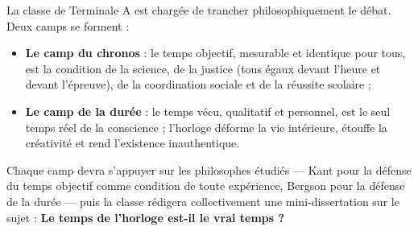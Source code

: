 \documentclass[11pt]{article}
\newcommand{\cle}[1]{{\popxbold\color{popdark}#1}}
\newcounter{popsec}
\newcounter{popsub}
\newcommand{\courssub}[1]{%
  \stepcounter{popsub}%
  \par\vspace{9pt}\noindent{\popxbold\fontsize{11.5}{13}\selectfont\color{popink}{\color{poporange}\thepopsec.\thepopsub}\hspace{6pt}#1}\par\nopagebreak\vspace{4pt}
}
\begin{document}
La classe de Terminale A est chargée de trancher philosophiquement le débat. Deux camps se forment :

\begin{itemize}
\item \textbf{Le camp du \cle{chronos}} : le temps objectif, mesurable et identique pour tous, est la condition de la science, de la justice (tous égaux devant l'heure et devant l'épreuve), de la coordination sociale et de la réussite scolaire ;
\item \textbf{Le camp de la \cle{durée}} : le temps vécu, qualitatif et personnel, est le seul temps réel de la conscience ; l'horloge déforme la vie intérieure, étouffe la créativité et rend l'existence inauthentique.
\end{itemize}

Chaque camp devra s'appuyer sur les philosophes étudiés — Kant pour la défense du temps objectif comme condition de toute expérience, Bergson pour la défense de la durée — puis la classe rédigera collectivement une mini-dissertation sur le sujet : \textbf{\guillemotleft Le temps de l'horloge est-il le vrai temps ? \guillemotright}

\courssub{Consignes}
\end{document}
